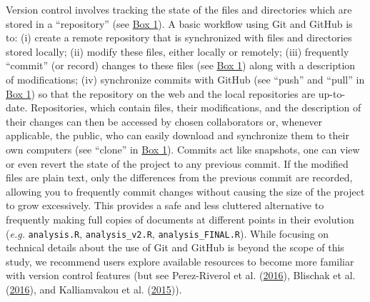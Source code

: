 Version control involves tracking the state of the files and directories which are stored in a ``repository'' (see \protect\hyperlink{definitions}{Box 1}).
A basic workflow using Git and GitHub is to: (i) create a remote repository that is synchronized with files and directories stored locally; (ii) modify these files, either locally or remotely; (iii) frequently ``commit'' (or record) changes to these files (see \protect\hyperlink{definitions}{Box 1}) along with a description of modifications; (iv) synchronize commits with GitHub (see ``push'' and ``pull'' in \protect\hyperlink{definitions}{Box 1}) so that the repository on the web and the local repositories are up-to-date.
Repositories, which contain files, their modifications, and the description of their changes can then be accessed by chosen collaborators or, whenever applicable, the public, who can easily download and synchronize them to their own computers (see ``clone'' in \protect\hyperlink{definitions}{Box 1}).
Commits act like snapshots, one can view or even revert the state of the project to any previous commit.
If the modified files are plain text, only the differences from the previous commit are recorded, allowing you to frequently commit changes without causing the size of the project to grow excessively.
This provides a safe and less cluttered alternative to frequently making full copies of documents at different points in their evolution (\emph{e.g.} \texttt{analysis.R}, \texttt{analysis\_v2.R}, \texttt{analysis\_FINAL.R}).
While focusing on technical details about the use of Git and GitHub is beyond the scope of this study, we recommend users explore available resources to become more familiar with version control features (but see Perez-Riverol et al. (\protect\hyperlink{ref-kEX5dgzK}{2016}), Blischak et al. (\protect\hyperlink{ref-PlcxShQU}{2016}), and Kalliamvakou et al. (\protect\hyperlink{ref-ndfO9H}{2015})).

